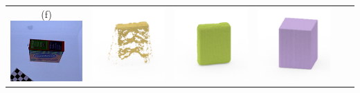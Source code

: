 \documentclass[10pt,onecolumn,letterpaper]{article}
\begin{document}
\begin{tabular}{cccccc}
(f) \includegraphics[height=\turnheight, clip=true, trim=20 30 30 5]{sunkist_fruit_snacks_mixed_fruit.png} &
\includegraphics[height=\turnheight, clip=true, trim=60 30 30 5]{sunkist_fruit_snacks_mixed_fruit_NP4_0_visible_pixels_view_90.png} &
\includegraphics[height=\turnheight, clip=true, trim=60 30 30 5]{sunkist_fruit_snacks_mixed_fruit_NP4_0_gt_view_90.png} &
\includegraphics[height=\turnheight, clip=true, trim=60 30 30 5]{sunkist_fruit_snacks_mixed_fruit_NP4_0_bb_view_90.png} &

\end{tabular}
\end{document}
